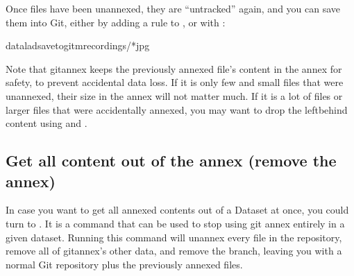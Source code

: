 \sphinxAtStartPar
Once files have been unannexed, they are “untracked” again, and you can save them
into Git, either by adding a rule to , or with
:

\begin{sphinxVerbatim}[commandchars=\\\{\}]
dataladsave\PYGZhy{}\PYGZhy{}to\PYGZhy{}git\PYGZhy{}mrecordings/*jpg
\end{sphinxVerbatim}

\sphinxAtStartPar
Note that git\sphinxhyphen{}annex keeps the previously annexed file’s content in the annex for safety, to prevent accidental data loss.
If it is only few and small files that were unannexed, their size in the annex will not matter much.
If it is a lot of files or larger files that were accidentally annexed, you may want to drop the left\sphinxhyphen{}behind content using  and .

\ignorespaces 

\subsection{Get all content out of the annex (remove the annex)}
\label{\detokenize{basics/101-136-filesystem:get-all-content-out-of-the-annex-remove-the-annex}}\label{\detokenize{basics/101-136-filesystem:uninit}}\label{\detokenize{basics/101-136-filesystem:index-14}}
\sphinxAtStartPar
In case you want to get all annexed contents out of a Dataset at once, you could turn to .
It is a command that can be used to stop using git annex entirely in a given dataset.
Running this command will unannex every file in the repository, remove all of git\sphinxhyphen{}annex’s other data, and remove the {\hyperref[\detokenize{glossary:term-git-annex}]{}} branch, leaving you with a normal Git repository plus the previously annexed files.

